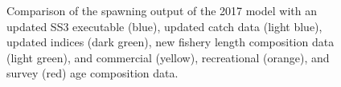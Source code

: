 \documentclass[
]{scrartcl}
\begin{document}
\begin{figure}


\caption{\label{fig-newdata_3}Comparison of the spawning output of the
2017 model with an updated SS3 executable (blue), updated catch data
(light blue), updated indices (dark green), new fishery length
composition data (light green), and commercial (yellow), recreational
(orange), and survey (red) age composition data.}

\end{figure}%
\end{document}
